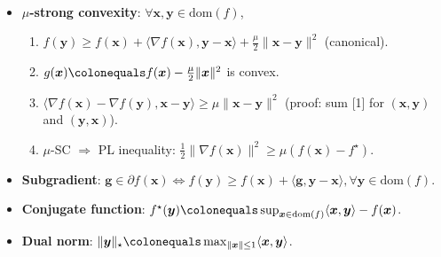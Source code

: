 \documentclass[8pt,a4paper]{extarticle}
\renewcommand{\vec}[1]{\bm{#1}}
\newcommand{\dom}[1]{\mathrm{dom}(#1)}
\newenvironment{topic}[1]
{\textbf{\sffamily \colorbox{black}{\rlap{\textbf{\textcolor{white}{#1}}}\hspace{\linewidth}\hspace{-2\fboxsep}}} \\ \vspace{0.2cm}}
{}
\begin{document}
\begin{multicols*}{2}
\begin{topic}{Definitions}
\begin{itemize}
            \item \textbf{$\mu$-strong convexity}: $\forall \vec{x}, \vec{y} \in \dom{f}$,
                  \begin{enumerate}
                      \item $f(\vec{y}) \geq f(\vec{x}) + \langle \nabla f(\vec{x}), \vec{y} - \vec{x} \rangle + \frac{\mu}{2} \| \vec{x} - \vec{y} \|^2$ (canonical).
                      \item $g(\vec{x}) \colonequals f(\vec{x}) - \frac{\mu}{2} \| \vec{x} \|^2$ is convex.
                      \item $\langle \nabla f(\vec{x}) - \nabla f(\vec{y}), \vec{x} - \vec{y} \rangle \geq \mu \| \vec{x} - \vec{y} \|^2$ (proof: sum [1] for $(\vec{x}, \vec{y})$ and $(\vec{y}, \vec{x})$).
                      \item $\mu$-SC $\Rightarrow$ PL inequality: $\frac{1}{2} \| \nabla f(\vec{x}) \|^2 \geq \mu (f(\vec{x}) - f^\star)$.
                  \end{enumerate}
            \item \textbf{Subgradient}: $\vec{g} \in \partial f(\vec{x}) \Leftrightarrow f(\vec{y}) \geq f(\vec{x}) + \langle \vec{g}, \vec{y} - \vec{x} \rangle, \forall \vec{y} \in \dom{f}$.
            \item \textbf{Conjugate function}: $f^\star(\vec{y}) \colonequals \sup_{\vec{x} \in \dom{f}} \langle \vec{x}, \vec{y} \rangle - f(\vec{x})$.
            \item \textbf{Dual norm}: $\| \vec{y} \|_\star \colonequals \max_{\| \vec{x} \| \leq 1} \langle \vec{x}, \vec{y} \rangle$.
        \end{itemize}
    \end{topic}


\end{multicols*}
\end{document}
